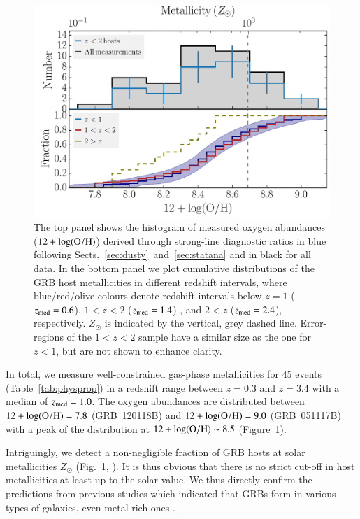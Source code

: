 \documentclass[traditabstract, longauth]{aa}
\newcommand{\oh}{12+\log(\rm{O/H})}
\begin{document}
\begin{figure}
\includegraphics[angle=0, width=0.99\columnwidth]{Figs/Z_histogram.pdf}
\caption{The top panel shows the histogram of measured oxygen abundances ($\oh$) derived through strong-line diagnostic ratios in blue following Sects.~\ref{sec:dusty}~and~\ref{sec:statana} and in black for all data. In the bottom panel we plot cumulative distributions of the GRB host metallicities in different redshift intervals, where blue/red/olive colours denote redshift intervals below $z=1$ ($z_{\rm{med}}=0.6$), $1<z<2$ ($z_{\rm{med}}=1.4$) , and $2<z$ ($z_{\rm{med}}=2.4$), respectively. $Z_{\odot}$ is indicated by the vertical, grey dashed line. Error-regions of the $1<z<2$ sample have a similar size as the one for $z<1$, but are not shown to enhance clarity.}
\label{fig:zhist}
\end{figure}

In total, we measure well-constrained gas-phase metallicities for 45 events (Table~\ref{tab:physprop}) in a redshift range between $z=0.3$ and $z=3.4$ with a median of $z_{\rm {med}}=1.0$. The oxygen abundances are distributed between $\oh=7.8$ (GRB~120118B) and $\oh=9.0$ (GRB~051117B) with a peak of the distribution at $\oh \sim 8.5$ (Figure~\ref{fig:zhist}). 

Intriguingly, we detect a non-negligible fraction of GRB hosts at solar metallicities $Z_{\odot}$ (Fig.~\ref{fig:zhist}, \citealp[see also][]{2010ApJ...712L..26L, 2013A&A...556A..23E}). It is thus obvious that there is no strict cut-off in host metallicities at least up to the solar value. We thus directly confirm the predictions from previous studies which indicated that GRBs form in various types of galaxies, even metal rich ones \citep{2007ApJ...660..504B, 2011A&A...534A.108K, 2013ApJ...778..128P, 2015arXiv150402479P}.
\end{document}
